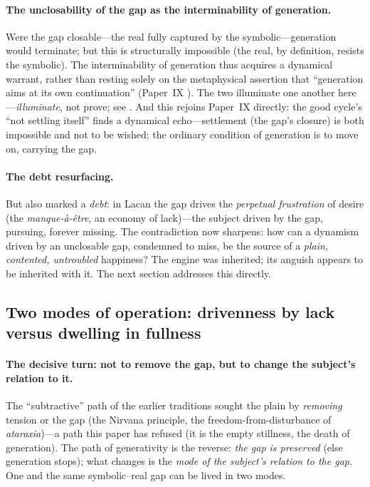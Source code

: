 \paragraph{The unclosability of the gap as the interminability of generation.} Were the gap closable---the real fully captured by the symbolic---generation would terminate; but this is structurally impossible (the real, by definition, resists the symbolic). The interminability of generation thus acquires a dynamical warrant, rather than resting solely on the metaphysical assertion that ``generation aims at its own continuation'' (Paper~IX \parencite{paperix}). The two illuminate one another here---\emph{illuminate}, not prove; see . And this rejoins Paper~IX directly: the good cycle's ``not settling itself'' finds a dynamical echo---settlement (the gap's closure) is both impossible and not to be wished; the ordinary condition of generation is to move on, carrying the gap.

\paragraph{The debt resurfacing.} But  also marked a \emph{debt}: in Lacan the gap drives the \emph{perpetual frustration} of desire (the \emph{manque-à-être}, an economy of lack)---the subject driven by the gap, pursuing, forever missing. The contradiction now sharpens: how can a dynamism driven by an unclosable gap, condemned to miss, be the source of a \emph{plain, contented, untroubled} happiness? The engine was inherited; its anguish appears to be inherited with it. The next section addresses this directly.

\subsection{Two modes of operation: drivenness by lack versus dwelling in fullness}
\label{p19:sub:gen-twomodes}

\paragraph{The decisive turn: not to remove the gap, but to change the subject's relation to it.} The ``subtractive'' path of the earlier traditions sought the plain by \emph{removing} tension or the gap (the Nirvana principle, the freedom-from-disturbance of \emph{ataraxia})---a path this paper has refused (it is the empty stillness, the death of generation). The path of generativity is the reverse: \emph{the gap is preserved} (else generation stops); what changes is the \emph{mode of the subject's relation to the gap}. One and the same symbolic--real gap can be lived in two modes.

